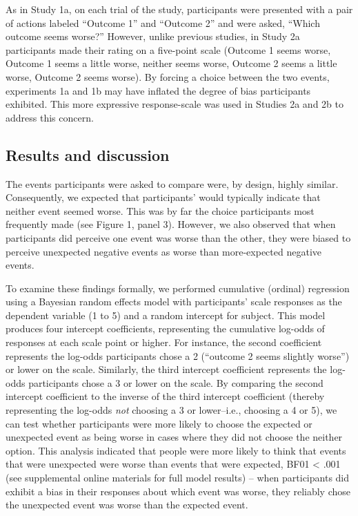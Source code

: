\documentclass[10pt, letterpaper]{article}
\begin{document}
As in Study 1a, on each trial of the study, participants were presented
with a pair of actions labeled ``Outcome 1'' and ``Outcome 2'' and were
asked, ``Which outcome seems worse?'' However, unlike previous studies,
in Study 2a participants made their rating on a five-point scale
(Outcome 1 seems worse, Outcome 1 seems a little worse, neither seems
worse, Outcome 2 seems a little worse, Outcome 2 seems worse). By
forcing a choice between the two events, experiments 1a and 1b may have
inflated the degree of bias participants exhibited. This more expressive
response-scale was used in Studies 2a and 2b to address this concern.

\subsection{Results and discussion}\label{results-and-discussion-2}

The events participants were asked to compare were, by design, highly
similar. Consequently, we expected that participants' would typically
indicate that neither event seemed worse. This was by far the choice
participants most frequently made (see Figure 1, panel 3). However, we
also observed that when participants did perceive one event was worse
than the other, they were biased to perceive unexpected negative events
as worse than more-expected negative events.

To examine these findings formally, we performed cumulative (ordinal)
regression using a Bayesian random effects model with participants'
scale responses as the dependent variable (1 to 5) and a random
intercept for subject. This model produces four intercept coefficients,
representing the cumulative log-odds of responses at each scale point or
higher. For instance, the second coefficient represents the log-odds
participants chose a 2 (``outcome 2 seems slightly worse'') or lower on
the scale. Similarly, the third intercept coefficient represents the
log-odds participants chose a 3 or lower on the scale. By comparing the
second intercept coefficient to the inverse of the third intercept
coefficient (thereby representing the log-odds \emph{not} choosing a 3
or lower--i.e., choosing a 4 or 5), we can test whether participants
were more likely to choose the expected or unexpected event as being
worse in cases where they did not choose the neither option. This
analysis indicated that people were more likely to think that events
that were unexpected were worse than events that were expected, BF01
\textless{} .001 (see supplemental online materials for full model
results) -- when participants did exhibit a bias in their responses
about which event was worse, they reliably chose the unexpected event
was worse than the expected event.
\end{document}
